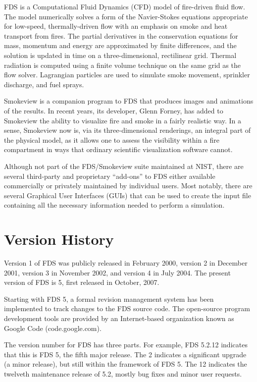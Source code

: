 \documentclass[11pt]{book}
\begin{document}
FDS is a Computational Fluid Dynamics (CFD) model of fire-driven fluid flow. The model numerically solves a form of the Navier-Stokes equations
appropriate for low-speed, thermally-driven flow with an emphasis on smoke and heat transport from fires. The partial derivatives in the conservation
equations for mass, momentum and energy are approximated by finite differences, and the solution is updated in time on a three-dimensional,
rectilinear grid. Thermal radiation is computed using a finite volume technique on the same grid as the flow solver. Lagrangian particles are used to
simulate smoke movement, sprinkler discharge, and fuel sprays.

Smokeview is a companion program to FDS that produces images and animations of the results. In recent years, its developer, Glenn Forney, has added
to Smokeview the ability to visualize fire and smoke in a fairly realistic way. In a sense, Smokeview now is, via its three-dimensional renderings,
an integral part of the physical model, as it allows one to assess the visibility within a fire compartment in ways that ordinary scientific
visualization software cannot.

Although not part of the FDS/Smokeview suite maintained at NIST, there are several third-party and proprietary ``add-ons'' to FDS either available
commercially or privately maintained by individual users. Most notably, there are several Graphical User Interfaces (GUIs) that can be used to create
the input file containing all the necessary information needed to perform a simulation.



\section{Version History}

Version 1 of FDS was publicly released in February 2000, version 2 in December 2001, version 3 in November 2002, and version 4 in July 2004. The
present version of FDS is 5, first released in October, 2007.

Starting with FDS 5, a formal revision management system has been implemented to track changes to the FDS source code. The open-source program
development tools are provided by an Internet-based organization known as Google Code (code.google.com).

The version number for FDS has three parts.  For example, FDS 5.2.12 indicates that this is FDS 5, the fifth major release. The 2 indicates a
significant upgrade (a minor release), but still within the framework of FDS 5.  The 12 indicates the twelveth maintenance release of 5.2, mostly bug fixes and minor user
requests.
\end{document}
